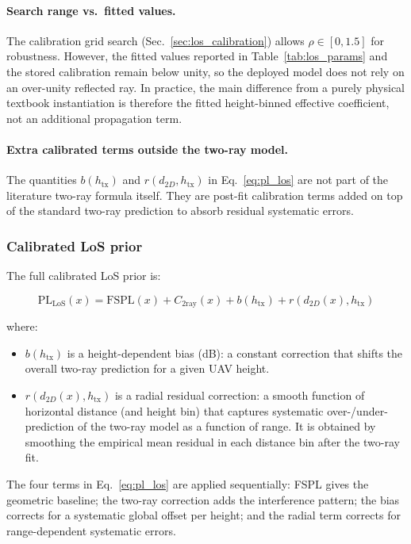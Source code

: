 \paragraph{Search range vs.\ fitted values.}
The calibration grid search (Sec.~\ref{sec:los_calibration}) allows
$\rho \in [0, 1.5]$ for robustness. However, the fitted values reported in
Table~\ref{tab:los_params} and the stored calibration remain below unity, so
the deployed model does not rely on an over-unity reflected ray. In practice,
the main difference from a purely physical textbook instantiation is therefore
the fitted height-binned effective coefficient, not an additional propagation
term.

\paragraph{Extra calibrated terms outside the two-ray model.}
The quantities $b(h_{\mathrm{tx}})$ and $r(d_{2D}, h_{\mathrm{tx}})$ in
Eq.~\eqref{eq:pl_los} are not part of the literature two-ray formula itself.
They are post-fit calibration terms added on top of the standard two-ray
prediction to absorb residual systematic errors.

\subsubsection{Calibrated LoS prior}

The full calibrated LoS prior is:

\begin{equation}
\mathrm{PL}_{\mathrm{LoS}}(x)
=
\mathrm{FSPL}(x)
+ C_{\mathrm{2ray}}(x)
+ b(h_{\mathrm{tx}})
+ r(d_{2D}(x), h_{\mathrm{tx}})
\label{eq:pl_los}
\end{equation}

where:
\begin{itemize}
\item $b(h_{\mathrm{tx}})$ is a height-dependent bias (dB): a constant
      correction that shifts the overall two-ray prediction for a given UAV
      height.
\item $r(d_{2D}(x), h_{\mathrm{tx}})$ is a radial residual correction: a
      smooth function of horizontal distance (and height bin) that captures
      systematic over-/under-prediction of the two-ray model as a function of
      range. It is obtained by smoothing the empirical mean residual in each
      distance bin after the two-ray fit.
\end{itemize}

The four terms in Eq.~\eqref{eq:pl_los} are applied sequentially:
FSPL gives the geometric baseline; the two-ray correction adds the
interference pattern; the bias corrects for a systematic global offset per
height; and the radial term corrects for range-dependent systematic errors.

